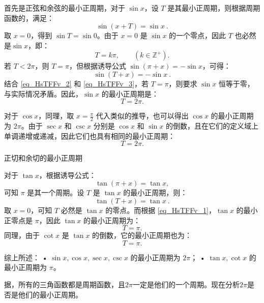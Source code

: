 首先是正弦和余弦的最小正周期，对于 $\sin x$，设 $T$ 是其最小正周期，则根据周期函数的，满足：
\begin{equation}\label{eq_HsTFFv_2}
\sin (x+T) = \sin x~.
\end{equation}
取 $x=0$，得到 $\sin T = \sin 0$。由于 $x=0$ 是 $\sin x$ 的一个零点，因此 $T$ 也必然是$\sin x$，即：
\begin{equation}
T = k\pi, \qquad (k\in\mathbb{Z}^+).
\end{equation}
若 $T<2\pi$，则 $T=\pi$，但根据诱导公式 $\sin(\pi + x) = -\sin x$，可得：
\begin{equation}\label{eq_HsTFFv_3}
\sin (T + x) = -\sin x~.
\end{equation}
结合 \autoref{eq_HsTFFv_2} 和 \autoref{eq_HsTFFv_3}，若 $T=\pi$，则要求 $\sin x$ 恒等于零，与实际情况矛盾。因此，$\sin x$ 的最小正周期是：
\begin{equation}
T = 2\pi.
\end{equation}

对于 $\cos x$，同理，取 $x=\frac{\pi}{2}$ 代入类似的推导，也可以得出 $\cos x$ 的最小正周期为 $2\pi$。由于 $\sec x$ 和 $\csc x$ 分别是 $\cos x$ 和 $\sin x$ 的倒数，且在它们的定义域上单调递增或递减，因此它们也具有相同的最小正周期：
\begin{equation}
T = 2\pi.
\end{equation}

正切和余切的最小正周期

对于 $\tan x$，根据诱导公式：
\begin{equation}
\tan (\pi + x) = \tan x,
\end{equation}
可知 $\pi$ 是其一个周期。设 $T$ 是 $\tan x$ 的最小正周期，则：
\begin{equation}
\tan (T + x) = \tan x~.
\end{equation}
取 $x=0$，可知 $T$ 必然是 $\tan x$ 的零点。而根据 \autoref{eq_HsTFFv_1}，$\tan x$ 的最小正零点是 $\pi$，因此 $\tan x$ 的最小正周期为：
\begin{equation}
T = \pi.
\end{equation}
同理，由于 $\cot x$ 是 $\tan x$ 的倒数，它的最小正周期也为：
\begin{equation}
T = \pi.
\end{equation}

综上所述：
	•	$\sin x, \cos x, \sec x, \csc x$ 的最小正周期为 $2\pi$；
	•	$\tan x, \cot x$ 的最小正周期为 $\pi$。


据，所有的三角函数都是周期函数，且$2\pi$一定是他们的一个周期。现在分析$2\pi$是否是他们的最小正周期。

